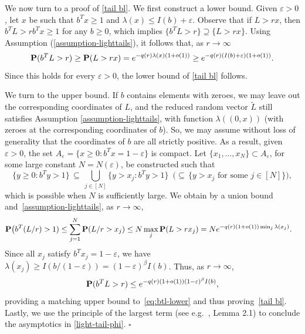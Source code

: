 \documentclass[a4paper, a4wide, 10pt, reqno]{amsart}
\theoremstyle{plain}
\renewcommand{\qed}{\hfill$\square$}
\begin{document}
  
\smallskip 
We now turn to a proof of \eqref{tail bl}. We first construct a lower bound. Given $\varepsilon>0$, let $x$ be such that $b^Tx\geq 1$ and $\lambda(x) \leq I(b)+\varepsilon$. Observe that if $L>rx$, then $b^TL>rb^Tx\ge 1$ for any $b\ge 0$, which implies $\{b^TL>r\}\supseteq \{L>rx\}$.
Using Assumption (\ref{assumption-lighttails}), it follows that, as $r\to\infty$
\begin{equation}\label{eq:btl-lower}
    {\bf P}( b^T L > r) 
    \geq  {\bf P}( L > rx) = e^{-q(r) \lambda (x)(1+o(1))} \geq e^{-q(r) (I(b)+\varepsilon)(1+o(1))}.
\end{equation}
Since this holds for every $\varepsilon>0$, the lower bound of \eqref{tail bl} follows.

\smallskip 
We turn to the upper bound. If $b$ contains elements with zeroes, we may leave out the corresponding coordinates of $L$, and the reduced random vector $\tilde L$ still satisfies Assumption 
\eqref{assumption-lighttails}, with function $\lambda ((0,x))$ (with zeroes at the corresponding coordinates of $b$). So, we may assume without loss of generality that the coordinates of $b$ are all strictly positive. 
As a result,  given $\varepsilon >0$, the set $A_{\varepsilon}=\{x\geq 0: b^Tx=1- \varepsilon \}$ is compact. 
Let  $\{x_1, \ldots,x_N\}\subset A_{\varepsilon}$, for some large constant $N=N(\varepsilon)$, be constructed such that 
\[
\{ y\ge 0: b^Ty>1\}\,\subseteq \,\bigcup_{j\in[N]}\{ y>x_j: b^Ty>1\}\,\,\,\Big(\subseteq \,\big\{y>x_j\text{ for some }j\in[N]\big\}\Big),
\]
which is possible when $N$ is sufficiently large.
  We obtain by a union bound and~\eqref{assumption-lighttails}, as $r\to\infty$,
\begin{align*}
     {\bf P}\big( b^T (L/r) > 1) \leq \sum_{j=1}^{N}  {\bf P}( L/r > x_j )\leq N \max_j {\bf P}( L > rx_j )&=  N e^{-q(r) (1+o(1)) \min_j \lambda (x_j)}.%
\end{align*}
Since all $x_j$ satisfy $b^Tx_j=1-\varepsilon$, we have $\lambda (x_j) \geq I(b/(1- \varepsilon)) = (1-\varepsilon)^\beta I(b)$. Thus, as $r\to\infty$,
\begin{equation}\nonumber
    {\bf P}( b^TL> r) \leq 
    e^{-q(r) (1+o(1)) (1-\varepsilon)^\beta I(b)},
\end{equation}
providing a matching upper bound to~\eqref{eq:btl-lower} and thus proving~\eqref{tail bl}.
Lastly, we use the principle of the largest term (see e.g.\ \cite{ganesh2004}, Lemma 2.1) to conclude the asymptotics in \eqref{light-tail-phi}.
\qed
\end{document}

